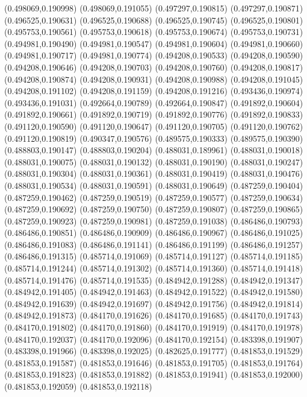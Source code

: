 (0.498069,0.190998)
(0.498069,0.191055)
(0.497297,0.190815)
(0.497297,0.190871)
(0.496525,0.190631)
(0.496525,0.190688)
(0.496525,0.190745)
(0.496525,0.190801)
(0.495753,0.190561)
(0.495753,0.190618)
(0.495753,0.190674)
(0.495753,0.190731)
(0.494981,0.190490)
(0.494981,0.190547)
(0.494981,0.190604)
(0.494981,0.190660)
(0.494981,0.190717)
(0.494981,0.190774)
(0.494208,0.190533)
(0.494208,0.190590)
(0.494208,0.190646)
(0.494208,0.190703)
(0.494208,0.190760)
(0.494208,0.190817)
(0.494208,0.190874)
(0.494208,0.190931)
(0.494208,0.190988)
(0.494208,0.191045)
(0.494208,0.191102)
(0.494208,0.191159)
(0.494208,0.191216)
(0.493436,0.190974)
(0.493436,0.191031)
(0.492664,0.190789)
(0.492664,0.190847)
(0.491892,0.190604)
(0.491892,0.190661)
(0.491892,0.190719)
(0.491892,0.190776)
(0.491892,0.190833)
(0.491120,0.190590)
(0.491120,0.190647)
(0.491120,0.190705)
(0.491120,0.190762)
(0.491120,0.190819)
(0.490347,0.190576)
(0.489575,0.190333)
(0.489575,0.190390)
(0.488803,0.190147)
(0.488803,0.190204)
(0.488031,0.189961)
(0.488031,0.190018)
(0.488031,0.190075)
(0.488031,0.190132)
(0.488031,0.190190)
(0.488031,0.190247)
(0.488031,0.190304)
(0.488031,0.190361)
(0.488031,0.190419)
(0.488031,0.190476)
(0.488031,0.190534)
(0.488031,0.190591)
(0.488031,0.190649)
(0.487259,0.190404)
(0.487259,0.190462)
(0.487259,0.190519)
(0.487259,0.190577)
(0.487259,0.190634)
(0.487259,0.190692)
(0.487259,0.190750)
(0.487259,0.190807)
(0.487259,0.190865)
(0.487259,0.190923)
(0.487259,0.190981)
(0.487259,0.191038)
(0.486486,0.190793)
(0.486486,0.190851)
(0.486486,0.190909)
(0.486486,0.190967)
(0.486486,0.191025)
(0.486486,0.191083)
(0.486486,0.191141)
(0.486486,0.191199)
(0.486486,0.191257)
(0.486486,0.191315)
(0.485714,0.191069)
(0.485714,0.191127)
(0.485714,0.191185)
(0.485714,0.191244)
(0.485714,0.191302)
(0.485714,0.191360)
(0.485714,0.191418)
(0.485714,0.191476)
(0.485714,0.191535)
(0.484942,0.191288)
(0.484942,0.191347)
(0.484942,0.191405)
(0.484942,0.191463)
(0.484942,0.191522)
(0.484942,0.191580)
(0.484942,0.191639)
(0.484942,0.191697)
(0.484942,0.191756)
(0.484942,0.191814)
(0.484942,0.191873)
(0.484170,0.191626)
(0.484170,0.191685)
(0.484170,0.191743)
(0.484170,0.191802)
(0.484170,0.191860)
(0.484170,0.191919)
(0.484170,0.191978)
(0.484170,0.192037)
(0.484170,0.192096)
(0.484170,0.192154)
(0.483398,0.191907)
(0.483398,0.191966)
(0.483398,0.192025)
(0.482625,0.191777)
(0.481853,0.191529)
(0.481853,0.191587)
(0.481853,0.191646)
(0.481853,0.191705)
(0.481853,0.191764)
(0.481853,0.191823)
(0.481853,0.191882)
(0.481853,0.191941)
(0.481853,0.192000)
(0.481853,0.192059)
(0.481853,0.192118)
